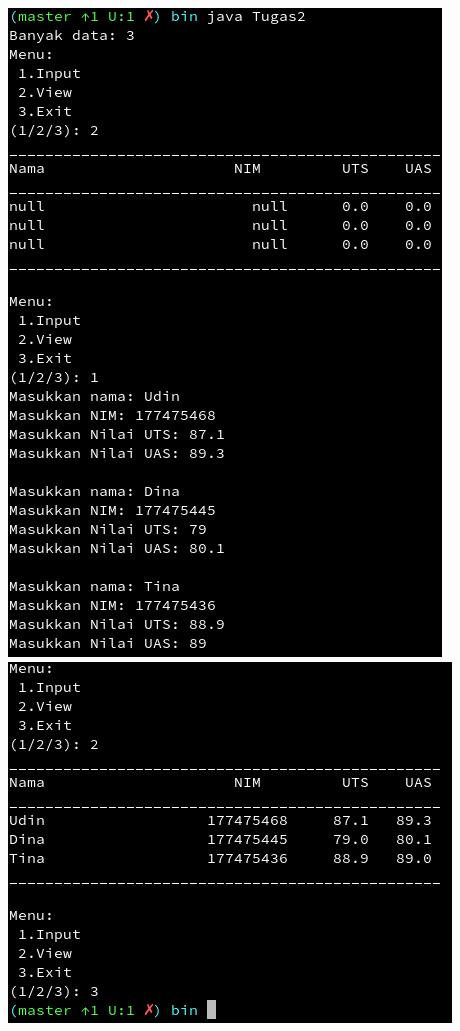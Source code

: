 \documentclass[a4paper,12pt]{article}
\begin{document}
\begin{center}
    \includegraphics[scale=.7]{Tugas2a.png}
    \includegraphics[scale=.7]{Tugas2b.png}
\end{center}
\end{document}
